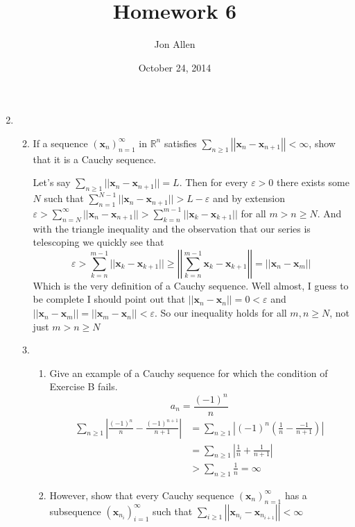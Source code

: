\documentclass[letterpaper]{article}
\begin{document}
\title{Homework 6}
\date{October 24, 2014}
\author{Jon Allen}
\maketitle
\renewcommand{\labelenumi}{4.\arabic{enumi}}
\renewcommand{\labelenumii}{\Alph{enumii}.}
\renewcommand{\labelenumiii}{(\alph{enumiii})}
\begin{enumerate}
\setcounter{enumi}{1}
\item
  \begin{enumerate}
  \setcounter{enumii}{1}
  \item
    If a sequence $(\boldsymbol{x}_n)_{n=1}^\infty$ in $\mathbb{R}^n$ satisfies $\sum_{n\ge1}{\left\lvert\left\lvert\boldsymbol{x}_n-\boldsymbol{x}_{n+1}\right\rvert\right\rvert}<\infty$, show that it is a Cauchy sequence.

    Let's say $\sum_{n\ge1}||\boldsymbol{x}_n-\boldsymbol{x}_{n+1}||=L$.
    Then for every $\varepsilon>0$ there exists some $N$ such that
    $\sum\limits_{n=1}^{N-1}{||\boldsymbol{x}_n-\boldsymbol{x}_{n+1}||}>L-\varepsilon$
    and by extension $\varepsilon>\sum\limits_{n=N}^\infty{||\boldsymbol{x}_n-\boldsymbol{x}_{n+1}||}
    >\sum\limits_{k=n}^{m-1}{||\boldsymbol{x}_k-\boldsymbol{x}_{k+1}||}$ for all $m>n\ge N$.
    And with the triangle inequality and the observation that our series is telescoping we quickly see that
    \[\varepsilon>\sum\limits_{k=n}^{m-1}{||\boldsymbol{x}_k-\boldsymbol{x}_{k+1}||}\ge \left\lvert\left\lvert\sum\limits_{k=n}^{m-1}{\boldsymbol{x}_k-\boldsymbol{x}_{k+1}}\right\rvert\right\rvert=||\boldsymbol{x}_n-\boldsymbol{x}_{m}||\]
    Which is the very definition of a Cauchy sequence.
    Well almost, I guess to be complete I should point out that $||\boldsymbol{x}_n-\boldsymbol{x}_n||=0<\varepsilon$ and $||\boldsymbol{x}_n-\boldsymbol{x}_m||=||\boldsymbol{x}_m-\boldsymbol{x}_n||<\varepsilon$.
    So our inequality holds for all $m,n\ge N$, not just $m>n\ge N$

  \item
    \begin{enumerate}
    \item
      Give an example of a Cauchy sequence for which the condition of Exercise B fails.
      \[a_n=\frac{(-1)^n}{n}\]
      \begin{align*}
        \sum\limits_{n\ge 1}{\left\lvert\frac{(-1)^n}{n}-\frac{(-1)^{n+1}}{n+1}\right\rvert}
        &=\sum\limits_{n\ge 1}{\left\lvert(-1)^n\left(\frac{1}{n}-\frac{-1}{n+1}\right)\right\rvert}\\
        &=\sum\limits_{n\ge 1}{\left\lvert\frac{1}{n}+\frac{1}{n+1}\right\rvert}\\
        &>\sum\limits_{n\ge 1}{\frac{1}{n}}=\infty
      \end{align*}
    \item
      However, show that every Cauchy sequence $(\boldsymbol{x}_n)_{n=1}^\infty$ has a subsequence $(\boldsymbol{x}_{n_i})_{i=1}^\infty$ such that $\sum_{i\ge1}\left\lvert\left\lvert \boldsymbol{x}_{n_i}-\boldsymbol{x}_{n_{i+1}}\right\rvert\right\rvert<\infty$


\end{enumerate}
\end{enumerate}
\end{enumerate}
\end{document}
